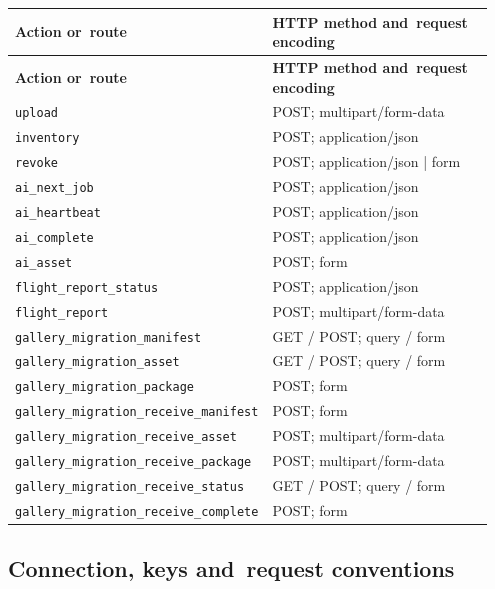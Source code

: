 \documentclass[11pt,a4paper]{article}
\newcommand{\codeword}[1]{\nolinkurl{#1}}
\begin{document}
\begin{longtable}{@{}>{\RaggedRight\arraybackslash}p{0.28\linewidth}>{\RaggedRight\arraybackslash}p{0.67\linewidth}@{}}
\toprule
\textbf{Action or~route} & \textbf{HTTP method and~request encoding} \\
\midrule
\endfirsthead
\toprule
\textbf{Action or~route} & \textbf{HTTP method and~request encoding} \\
\midrule
\endhead
\bottomrule
\endfoot
\codeword{upload} & POST; multipart/form-data \\
\codeword{inventory} & POST; application/json \\
\codeword{revoke} & POST; application/json | form \\
\codeword{ai_next_job} & POST; application/json \\
\codeword{ai_heartbeat} & POST; application/json \\
\codeword{ai_complete} & POST; application/json \\
\codeword{ai_asset} & POST; form \\
\codeword{flight_report_status} & POST; application/json \\
\codeword{flight_report} & POST; multipart/form-data \\
\codeword{gallery_migration_manifest} & GET / POST; query / form \\
\codeword{gallery_migration_asset} & GET / POST; query / form \\
\codeword{gallery_migration_package} & POST; form \\
\codeword{gallery_migration_receive_manifest} & POST; form \\
\codeword{gallery_migration_receive_asset} & POST; multipart/form-data \\
\codeword{gallery_migration_receive_package} & POST; multipart/form-data \\
\codeword{gallery_migration_receive_status} & GET / POST; query / form \\
\codeword{gallery_migration_receive_complete} & POST; form \\
\end{longtable}

\subsection{\texorpdfstring{Connection, keys and~request conventions}{Connection, keys and request conventions}}

\label{api352:connection}
\end{document}
